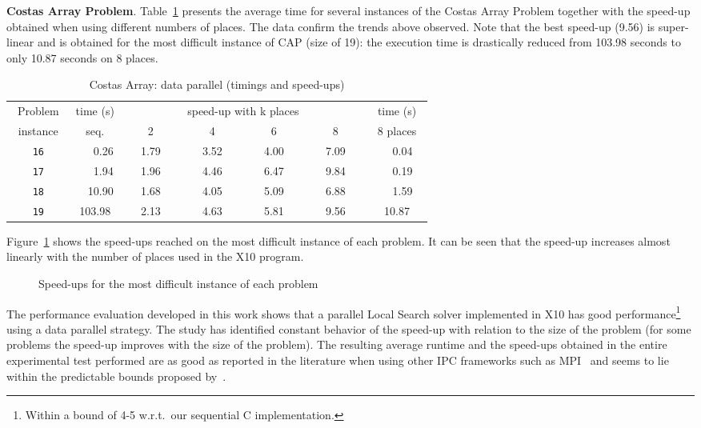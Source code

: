 \documentclass{llncs}
\newcommand{\BL}{\vspace{\baselineskip}}
\begin{document}
\BL \noindent \textbf{Costas Array Problem}.
Table~\ref{tab:CAPResult} presents the average time for several instances of
the Costas Array Problem together with the speed-up obtained when using
different numbers of places. The data confirm the trends above observed.
Note that the best speed-up (9.56) is super-linear and is obtained for the most difficult
instance of CAP (size of 19): the execution time is drastically reduced from
103.98 seconds to only 10.87 seconds on 8 places.

\begin{table}[htb]
  \begin{center}
  \begin{tabular}{||c|c|c|c|c|c|c||}
    \hline
    ~Problem~ & time (s) & \multicolumn{4}{|c|}{speed-up with k places}  & time (s) \\
    \cline{3-6}
    instance  & seq.     & ~~~~2~~~~ & ~~~~4~~~~ & ~~~~6~~~~ & ~~~~8~~~~ &~8 places~\\
    \hline
    \hline
    \texttt{16} & ~~~0.26 & 1.79 & 3.52 & 4.00 & 7.09 & ~~0.04 \\
    \texttt{17} & ~~~1.94 & 1.96 & 4.46 & 6.47 & 9.84 & ~~0.19 \\
    \texttt{18} & ~~10.90 & 1.68 & 4.05 & 5.09 & 6.88 & ~~1.59 \\
    \texttt{19} & 103.98 & 2.13 & 4.63 & 5.81 & 9.56 & 10.87 \\
    \hline
  \end{tabular}
  \end{center}
  \caption{Costas Array: data parallel (timings and speed-ups)}
  \label{tab:CAPResult}
\end{table}

Figure~\ref{fig:BenchmarkSpeed-Ups} shows the
speed-ups reached on the most difficult instance of each problem. It can be
seen that the speed-up increases almost linearly with the number of
places used in the X10 program.

\begin{figure}[htb]
\centerline{} 
\caption{Speed-ups for the most difficult instance of each problem}\label{fig:BenchmarkSpeed-Ups}
\end{figure}

The performance evaluation developed in this work shows that a
parallel Local Search solver implemented in X10 has good
performance\footnote{Within a bound of 4-5 w.r.t.~our sequential C
  implementation.}  using a data parallel strategy.  The study has
identified constant behavior of the speed-up with relation to the size
of the problem (for some problems the speed-up improves with the size
of the problem).  The resulting average runtime and the speed-ups
obtained in the entire experimental test performed are as good as
reported in the literature when using other IPC frameworks such as
MPI~\cite{Diaz2011,diaz12,DBLP:conf/evoW/CaniouCDA11} and seems to lie
within the predictable bounds proposed
by~\cite{DBLP:journals/corr/abs-1212-4287}.
\end{document}
